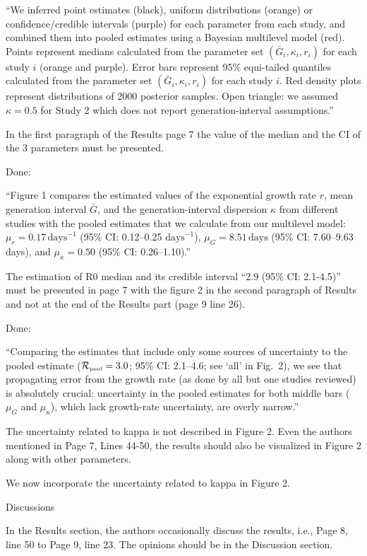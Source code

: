 \documentclass[12pt]{article}
\newcommand{\Rpool}{\ensuremath{{\mathcal R}_{\textrm{\tiny{pool}}}}\xspace}
\newcommand{\revtext}{\textsf}
\begin{document}
``We inferred point estimates (black), uniform distributions (orange) or confidence/credible intervals (purple) for each parameter from each study, and combined them into pooled estimates using a Bayesian multilevel model (red).
Points represent medians calculated from the parameter set $(\bar{G}_{i}, \kappa_{i}, r_{i})$ for each study $i$ (orange and purple).
Error bars represent 95\% equi-tailed quantiles calculated from the parameter set $(\bar{G}_{i}, \kappa_{i}, r_{i})$ for each study $i$.
Red density plots represent distributions of 2000 posterior samples.
Open triangle: we assumed $\kappa=0.5$ for Study 2 which does not report generation-interval assumptions.''

\revtext{In the first paragraph of the Results page 7 the value of the median and the CI of the 3
parameters must be presented.}

Done:

``Figure 1 compares the estimated values of the exponential growth rate $r$, mean generation interval $\bar G$, and the generation-interval dispersion $\kappa$ from different studies with the pooled estimates that we calculate from our multilevel model:
$\mu_r = 0.17\,\textrm{days}^{-1}$ (95\% CI: 0.12--0.25 $\textrm{days}^{-1}$),
$\mu_G = 8.51\,\textrm{days}$ (95\% CI: 7.60--9.63 days),
and
$\mu_\kappa = 0.50$ (95\% CI: 0.26--1.10).''

\revtext{The estimation of R0 median and its credible interval “2.9 (95\% CI: 2.1-4.5)” must be presented
in page 7 with the figure 2 in the second paragraph of Results and not at the end of the Results
part (page 9 line 26).}

Done:

``Comparing the estimates that include only some sources of uncertainty to the pooled estimate ($\Rpool = 3.0$; 95\% CI: 2.1--4.6; see `all' in Fig.~2), we see that propagating error from the growth rate (as done by all but one studies reviewed) is absolutely crucial: uncertainty in the pooled estimates for both middle bars ($\mu_G$ and $\mu_\kappa$), which lack growth-rate uncertainty, are overly narrow.''

\revtext{The uncertainty related to kappa is not described in Figure 2. Even the authors mentioned in
Page 7, Lines 44-50, the results should also be visualized in Figure 2 along with other
parameters.}

We now incorporate the uncertainty related to kappa in Figure 2.

\revtext{Discussions}

\revtext{In the Results section, the authors occasionally discuss the results, i.e., Page 8, line 50 to Page
9, line 23. The opinions should be in the Discussion section.}
\end{document}
